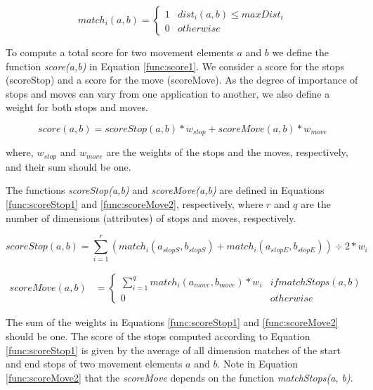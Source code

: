 \documentclass[12pt]{article}
\begin{document}
\begin{equation}
\label{func:match1}
  match_i(a, b) = 
  \begin{cases} 
      1 & dist_i(a, b) \leq maxDist_i \\
      0 & otherwise
  \end{cases}
\end{equation}

To compute a total score for two movement elements $a$ and $b$ we define the function \emph{score(a,b)} in Equation \ref{func:score1}. We consider a score for the stops (scoreStop) and a score for the move (scoreMove). As the degree of importance of stops and moves can vary from one application to another, we also define a weight for both stops and moves. 


\begin{equation}
\label{func:score1}
score(a, b) = scoreStop(a, b) * w_{stop} + scoreMove(a, b) * w_{move}  
\end{equation}

where, $w_{stop}$ and $w_{move}$ are the weights of the stops and the moves, respectively, and their sum should be one.

The functions \emph{scoreStop(a,b)} and \emph{scoreMove(a,b)} are defined in Equations \ref{func:scoreStop1} and \ref{func:scoreMove2}, respectively, where $r$ and $q$ are the number of dimensions (attributes) of stops and moves, respectively.


\begin{equation}
\label{func:scoreStop1}
  scoreStop(a, b) = \sum\limits_{i=1}^r (match_i(a_{stopS}, b_{stopS}) + match_i(a_{stopE}, b_{stopE}))\div 2* w_{i}
\end{equation}


\begin{equation}
\label{func:scoreMove2}
\begin{split}
scoreMove(a, b)  & = 
  \begin{cases} 
      \sum\limits_{i=1}^q match_i(a_{move}, b_{move}) * w_{i} & if matchStops(a, b)\\
      0 & otherwise
  \end{cases}
\end{split}
\end{equation}


The sum of the weights in Equations \ref{func:scoreStop1} and \ref{func:scoreMove2} should be one.
The score of the stops computed according to Equation \ref{func:scoreStop1} is given by the average of all dimension matches of the start and end stops of two movement elements $a$ and $b$. Note in Equation \ref{func:scoreMove2} that the \emph{scoreMove} depends on the function \textit{matchStops(a, b)}.
\end{document}
